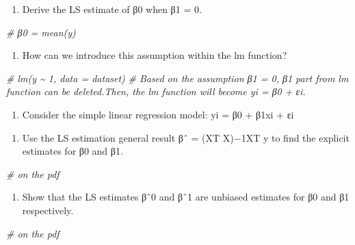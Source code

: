 \documentclass[
]{article}
\newenvironment{Shaded}{\begin{snugshade}}{\end{snugshade}}
\newcommand{\CommentTok}[1]{\textcolor[rgb]{0.56,0.35,0.01}{\textit{#1}}}
\providecommand{\tightlist}{%
  \setlength{\itemsep}{0pt}\setlength{\parskip}{0pt}}
\begin{document}
\begin{enumerate}
\def\labelenumi{(\alph{enumi})}
\setcounter{enumi}{4}
\tightlist
\item
  Derive the LS estimate of β0 when β1 = 0.
\end{enumerate}

\begin{Shaded}
\begin{Highlighting}[]
\CommentTok{\# β0 = mean(y)}
\end{Highlighting}
\end{Shaded}

\begin{enumerate}
\def\labelenumi{(\alph{enumi})}
\setcounter{enumi}{5}
\tightlist
\item
  How can we introduce this assumption within the lm function?
\end{enumerate}

\begin{Shaded}
\begin{Highlighting}[]
\CommentTok{\# lm(y \textasciitilde{} 1, data = dataset)}
\CommentTok{\# Based on the assumption β1 = 0, β1 part from lm function can be deleted.Then, the lm function will become  yi = β0 +  εi.}
\end{Highlighting}
\end{Shaded}

\begin{enumerate}
\def\labelenumi{\arabic{enumi}.}
\setcounter{enumi}{2}
\tightlist
\item
  Consider the simple linear regression model: yi = β0 + β1xi + εi
\end{enumerate}

\begin{enumerate}
\def\labelenumi{(\alph{enumi})}
\tightlist
\item
  Use the LS estimation general result βˆ = (XT X)−1XT y to find the
  explicit estimates for β0 and β1.
\end{enumerate}

\begin{Shaded}
\begin{Highlighting}[]
\CommentTok{\# on the pdf}
\end{Highlighting}
\end{Shaded}

\begin{enumerate}
\def\labelenumi{(\alph{enumi})}
\setcounter{enumi}{1}
\tightlist
\item
  Show that the LS estimates βˆ0 and βˆ1 are unbiased estimates for β0
  and β1 respectively.
\end{enumerate}

\begin{Shaded}
\begin{Highlighting}[]
\CommentTok{\# on the pdf}
\end{Highlighting}
\end{Shaded}
\end{document}
